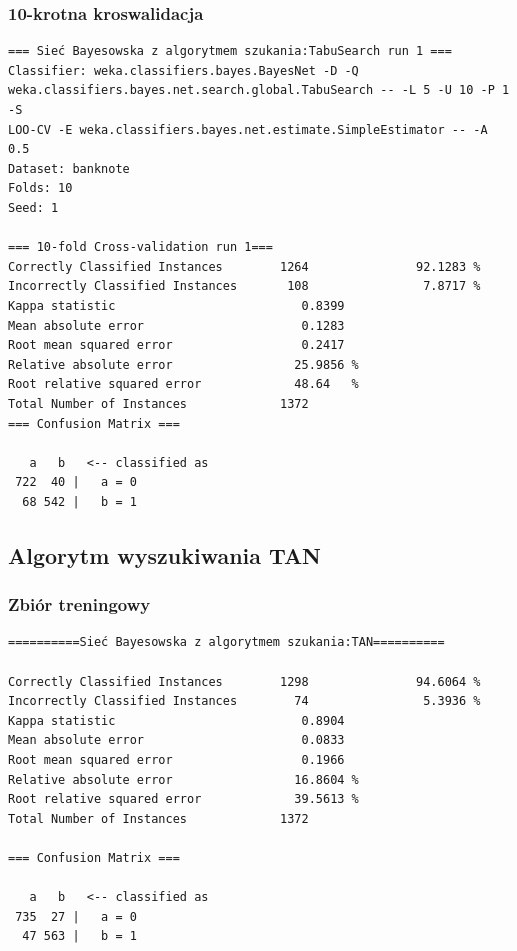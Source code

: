 \documentclass{classrep}
\begin{document}
\subsubsection*{10-krotna kroswalidacja}
\scriptsize 
\begin{verbatim}
=== Sieć Bayesowska z algorytmem szukania:TabuSearch run 1 ===
Classifier: weka.classifiers.bayes.BayesNet -D -Q
weka.classifiers.bayes.net.search.global.TabuSearch -- -L 5 -U 10 -P 1 -S
LOO-CV -E weka.classifiers.bayes.net.estimate.SimpleEstimator -- -A 0.5
Dataset: banknote
Folds: 10
Seed: 1

=== 10-fold Cross-validation run 1===
Correctly Classified Instances        1264               92.1283 %
Incorrectly Classified Instances       108                7.8717 %
Kappa statistic                          0.8399
Mean absolute error                      0.1283
Root mean squared error                  0.2417
Relative absolute error                 25.9856 %
Root relative squared error             48.64   %
Total Number of Instances             1372     
=== Confusion Matrix ===

   a   b   <-- classified as
 722  40 |   a = 0
  68 542 |   b = 1
\end{verbatim} 
\normalsize

\subsection{Algorytm wyszukiwania TAN}
\subsubsection*{Zbiór treningowy}
\scriptsize 
\begin{verbatim}
==========Sieć Bayesowska z algorytmem szukania:TAN==========

Correctly Classified Instances        1298               94.6064 %
Incorrectly Classified Instances        74                5.3936 %
Kappa statistic                          0.8904
Mean absolute error                      0.0833
Root mean squared error                  0.1966
Relative absolute error                 16.8604 %
Root relative squared error             39.5613 %
Total Number of Instances             1372     

=== Confusion Matrix ===

   a   b   <-- classified as
 735  27 |   a = 0
  47 563 |   b = 1
\end{verbatim} 
\normalsize
\end{document}
